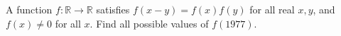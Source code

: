A function $f:\mathbb R\to\mathbb R$ satisfies $f(x-y)=f(x)f(y)$ for all real $x,y$, and $f(x)\ne0$ for all $x$. Find all possible values of $f(1977)$.
